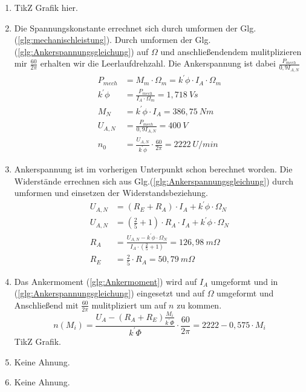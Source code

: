 \begin{solution}
\begin{enumerate}
\item TikZ Grafik hier.
\item Die Spannungskonstante errechnet sich durch umformen der Glg.(\ref{glg:mechanischleistung}). Durch umformen der Glg.(\ref{glg:Ankerspannungsgleichung}) auf $\Omega$ und anschließendendem mulitplizieren mir $\frac{60}{2 \pi}$ erhalten wir die Leerlaufdrehzahl. Die Ankerspannung ist dabei $\frac{P_{mech}}{0,9 I_{A,N}}$
\begin{align}
P_{mech} &=M_m \cdot \Omega_m = k^{'} \phi \cdot I_A \cdot \Omega_m\\
k^{'} \phi &= \frac{P_{mech}}{I_A \cdot \Omega_m} =1,718~Vs\\
M_N &= k^{'} \phi \cdot I_A = 386,75~Nm\\
U_{A,N} &= \frac{P_{mech}}{0,9 I_{A,N}} =400~V\\
n_0 &= \frac{U_{A,N}}{k^{'} \phi} \cdot \frac{60}{2\pi} =2222~U/min
\end{align}
\item Ankerspannung ist im vorherigen Unterpunkt schon berechnet worden. Die Widerst\"ande errechnen sich aus Glg.(\ref{glg:Ankerspannungsgleichung}) durch umformen und einsetzen der Widerstandsbeziehung.
\begin{align}
U_{A,N} &= (R_E + R_A) \cdot I_A +  k^{'} \phi \cdot \Omega_N\\
U_{A,N} &= \left (\frac{2}{5} + 1 \right ) \cdot R_A \cdot I_A +  k^{'} \phi \cdot \Omega_N\\
R_A &= \frac{U_{A,N}-k^{'} \phi \cdot \Omega_N}{I_A \cdot \left (\frac{2}{5} + 1 \right )}=126,98~m\Omega\\
R_E &= \frac{2}{5} \cdot R_A= 50,79~m\Omega
\end{align}
\item Das Ankermoment (\ref{glg:Ankermoment}) wird auf $I_A$ umgeformt und in (\ref{glg:Ankerspannungsgleichung}) eingesetzt und auf $\Omega$ umgeformt und Anschließend mit $\frac{60}{2 \pi}$ mulitpliziert um auf $n$ zu kommen.
\begin{equation}
n(M_i) = \frac{U_A - (R_A+R_E) \frac{ M_i}{k^{'} \Phi}}{k^{'}\Phi} \cdot \frac{60}{2 \pi} =2222-0,575 \cdot M_i
\end{equation}
TikZ Grafik.\\
\item Keine Ahnung.
\item Keine Ahnung.
\end{enumerate}
\end{solution}
